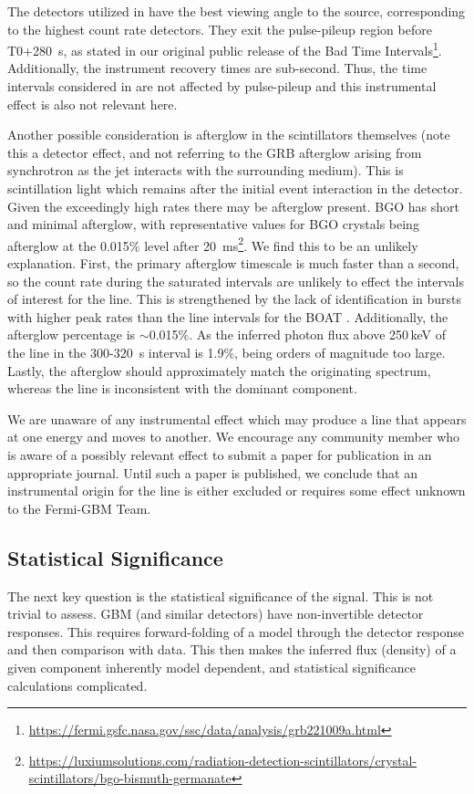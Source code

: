 \documentclass{aastex61}
\begin{document}
The detectors utilized in \citet{ravasio2024mega} have the best viewing angle to the source, corresponding to the highest count rate detectors. They exit the pulse-pileup region before T0+280~s, as stated in our original public release of the Bad Time Intervals\footnote{\url{https://fermi.gsfc.nasa.gov/ssc/data/analysis/grb221009a.html}}. Additionally, the instrument recovery times are sub-second. Thus, the time intervals considered in \citet{ravasio2024mega} are not affected by pulse-pileup and this instrumental effect is also not relevant here.

Another possible consideration is afterglow in the scintillators themselves (note this a detector effect, and not referring to the GRB afterglow arising from synchrotron as the jet interacts with the surrounding medium). This is scintillation light which remains after the initial event interaction in the detector. Given the exceedingly high rates there may be afterglow present. BGO has short and minimal afterglow, with representative values for BGO crystals being afterglow at the 0.015\% level after 20~ms\footnote{\url{https://luxiumsolutions.com/radiation-detection-scintillators/crystal-scintillators/bgo-bismuth-germanate}}. We find this to be an unlikely explanation. First, the primary afterglow timescale is much faster than a second, so the count rate during the saturated intervals are unlikely to effect the intervals of interest for the line. This is strengthened by the lack of identification in bursts with higher peak rates than the line intervals for the BOAT \citep{ravasio2024mega}. Additionally, the afterglow percentage is $\sim$0.015\%. As the inferred photon flux above 250\,keV of the line in the 300-320~s interval is 1.9\%, being orders of magnitude too large. Lastly, the afterglow should approximately match the originating spectrum, whereas the line is inconsistent with the dominant component.

We are unaware of any instrumental effect which may produce a line that appears at one energy and moves to another. We encourage any community member who is aware of a possibly relevant effect to submit a paper for publication in an appropriate journal. Until such a paper is published, we conclude that an instrumental origin for the line is either excluded or requires some effect unknown to the Fermi-GBM Team.


\subsection{Statistical Significance}
The next key question is the statistical significance of the signal. This is not trivial to assess. GBM (and similar detectors) have non-invertible detector responses. This requires forward-folding of a model through the detector response and then comparison with data. This then makes the inferred flux (density) of a given component inherently model dependent, and statistical significance calculations complicated. 
\end{document}

